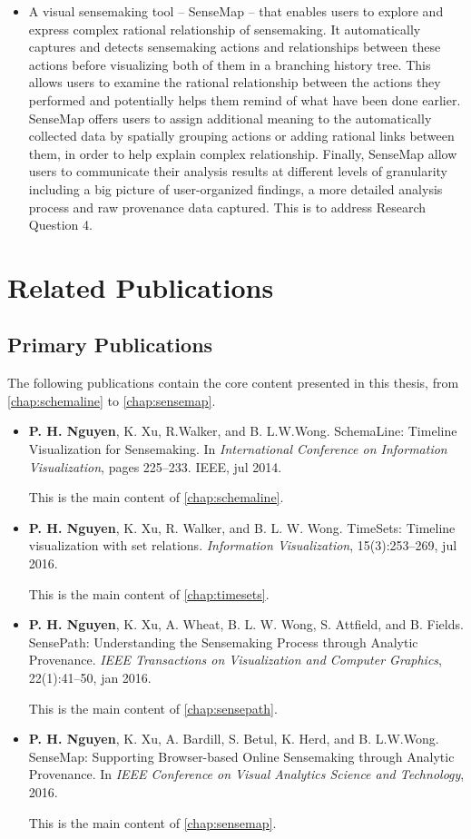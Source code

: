 \begin{itemize}
	\item A visual sensemaking tool -- SenseMap -- that enables users to explore and express complex rational relationship of sensemaking. It automatically captures and detects sensemaking actions and relationships between these actions before visualizing both of them in a branching history tree. This allows users to examine the rational relationship between the actions they performed and potentially helps them remind of what have been done earlier. SenseMap offers users to assign additional meaning to the automatically collected data by spatially grouping actions or adding rational links between them, in order to help explain complex relationship. Finally, SenseMap allow users to communicate their analysis results at different levels of granularity including a big picture of user-organized findings, a more detailed analysis process and raw provenance data captured. This is to address Research Question 4.
\end{itemize}

\section{Related Publications}

\subsection{Primary Publications} 
The following publications contain the core content presented in this thesis, from \autoref{chap:schemaline} to \autoref{chap:sensemap}.

\begin{itemize}
\item \textbf{P. H. Nguyen}, K. Xu, R.Walker, and B. L.W.Wong. SchemaLine: Timeline Visualization for Sensemaking. In \textit{International Conference on Information Visualization}, pages 225--233. IEEE, jul 2014.

This is the main content of \autoref{chap:schemaline}.

\item \textbf{P. H. Nguyen}, K. Xu, R. Walker, and B. L. W. Wong. TimeSets: Timeline visualization with set relations. \textit{Information Visualization}, 15(3):253--269, jul 2016. 

This is the main content of \autoref{chap:timesets}.

\item \textbf{P. H. Nguyen}, K. Xu, A. Wheat, B. L. W. Wong, S. Attfield, and B. Fields. SensePath: Understanding the Sensemaking Process through Analytic Provenance. \textit{IEEE Transactions on Visualization and Computer Graphics}, 22(1):41--50, jan 2016.

This is the main content of \autoref{chap:sensepath}.

\item \textbf{P. H. Nguyen}, K. Xu, A. Bardill, S. Betul, K. Herd, and B. L.W.Wong. SenseMap: Supporting Browser-based Online Sensemaking through Analytic Provenance. In \textit{IEEE Conference on Visual Analytics Science and Technology}, 2016.

This is the main content of \autoref{chap:sensemap}.
\end{itemize}


